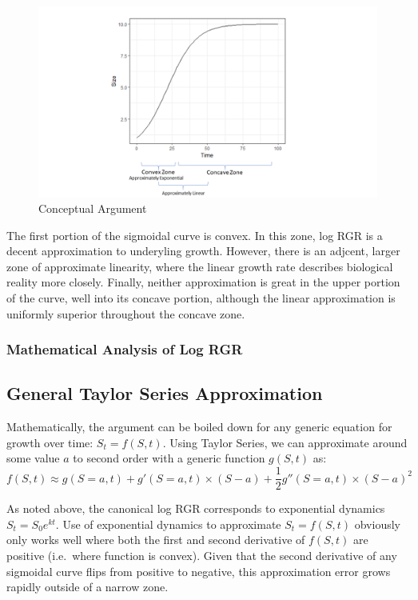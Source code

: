 \documentclass[]{article}
\begin{document}
\begin{figure}
\includegraphics[width=1\linewidth]{Conceptual_Fig} \caption{Conceptual Argument}\label{fig:unnamed-chunk-2}
\end{figure}

The first portion of the sigmoidal curve is convex. In this zone, log
RGR is a decent approximation to underyling growth. However, there is an
adjcent, larger zone of approximate linearity, where the linear growth
rate describes biological reality more closely. Finally, neither
approximation is great in the upper portion of the curve, well into its
concave portion, although the linear approximation is uniformly superior
throughout the concave zone.

\subsubsection{Mathematical Analysis of Log
RGR}\label{mathematical-analysis-of-log-rgr}

\subsection{General Taylor Series
Approximation}\label{general-taylor-series-approximation}

Mathematically, the argument can be boiled down for any generic equation
for growth over time: \(S_t = f(S,t)\). Using Taylor Series, we can
approximate around some value \(a\) to second order with a generic
function \(g(S,t)\) as:
\[f(S,t) \approx g(S=a,t) + g'(S=a,t) \times (S-a) + \frac{1}{2}g''(S=a,t)\times(S-a)^2\]

As noted above, the canonical log RGR corresponds to exponential
dynamics \(S_t = S_0e^{kt}\). Use of exponential dynamics to approximate
\(S_t = f(S,t)\) obviously only works well where both the first and
second derivative of \(f(S,t)\) are positive (i.e.~where function is
convex). Given that the second derivative of any sigmoidal curve flips
from positive to negative, this approximation error grows rapidly
outside of a narrow zone.
\end{document}
